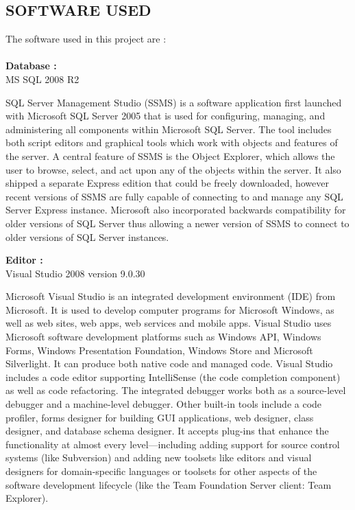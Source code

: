 \documentclass[14pt]{article} %
\begin{document}
 \subsection{SOFTWARE USED}
 \noindent The software used in this project are :\\
\\ \indent \textbf{Database :}\\
\indent MS SQL 2008 R2 \\ \par
  SQL Server Management Studio (SSMS) is a software application first launched with Microsoft SQL Server 2005 that is used for configuring, managing, and administering all components within Microsoft SQL Server. The tool includes both script editors and graphical tools which work with objects and features of the server.
A central feature of SSMS is the Object Explorer, which allows the user to browse, select, and act upon any of the objects within the server. It also shipped a separate Express edition that could be freely downloaded, however recent versions of SSMS are fully capable of connecting to and manage any SQL Server Express instance. Microsoft also incorporated backwards compatibility for older versions of SQL Server thus allowing a newer version of SSMS to connect to older versions of SQL Server instances.\\  \par
\textbf{Editor :}\\
\indent Visual Studio 2008 version 9.0.30\\ \par
Microsoft Visual Studio is an integrated development environment (IDE) from Microsoft. It is used to develop computer programs for Microsoft Windows, as well as web sites, web apps, web services and mobile apps. Visual Studio uses Microsoft software development platforms such as Windows API, Windows Forms, Windows Presentation Foundation, Windows Store and Microsoft Silverlight. It can produce both native code and managed code.
Visual Studio includes a code editor supporting IntelliSense (the code completion component) as well as code refactoring. The integrated debugger works both as a source-level debugger and a machine-level debugger. Other built-in tools include a code profiler, forms designer for building GUI applications, web designer, class designer, and database schema designer. It accepts plug-ins that enhance the functionality at almost every level—including adding support for source control systems (like Subversion) and adding new toolsets like editors and visual designers for domain-specific languages or toolsets for other aspects of the software development lifecycle (like the Team Foundation Server client: Team Explorer).\\  \par
\end{document}
